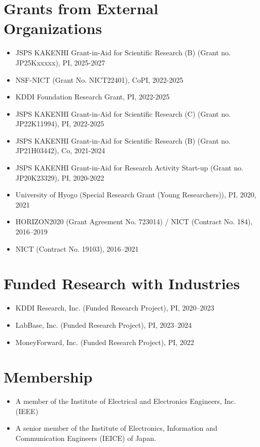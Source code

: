 \section*{Grants from External Organizations}
\begin{itemize}
 \item JSPS KAKENHI Grant-in-Aid for Scientific Research (B) (Grant no. JP25Kxxxxx), PI, 2025-2027
 \item NSF-NICT (Grant No. NICT22401), CoPI, 2022-2025
 \item KDDI Foundation Research Grant, PI, 2022-2025
 \item JSPS KAKENHI Grant-in-Aid for Scientific Research (C) (Grant no. JP22K11994), PI, 2022-2025
 \item JSPS KAKENHI Grant-in-Aid for Scientific Research (B) (Grant no. JP21H03442), Co, 2021-2024
 \item JSPS KAKENHI Grant-in-Aid for Research Activity Start-up (Grant no. JP20K23329), PI, 2020-2022
 \item University of Hyogo (Special Research Grant (Young Researchers)), PI, 2020, 2021
 \item HORIZON2020 (Grant Agreement No. 723014) / NICT (Contract No. 184), 2016--2019
 \item NICT (Contract No. 19103), 2016--2021
\end{itemize}

\section*{Funded Research with Industries}
\begin{itemize}
 \item KDDI Research, Inc. (Funded Research Project), PI, 2020--2023
 \item LabBase, Inc. (Funded Research Project), PI, 2023--2024
 \item MoneyForward, Inc. (Funded Research Project), PI, 2022
\end{itemize}



\section*{Membership}
\begin{itemize}
\item A member of the Institute of Electrical and Electronics Engineers, Inc. (IEEE)
\item A senior member of the Institute of Electronics, Information and Communication Engineers
(IEICE) of Japan.
\end{itemize}


